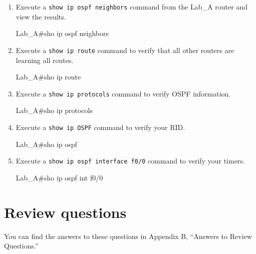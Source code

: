 \begin{enumerate}
\item
  Execute a \texttt{show\ ip\ ospf\ neighbors} command from the Lab\_A
  router and view the results.

\begin{cli}
Lab_A#sho ip ospf neighbors
\end{cli}
\item
  Execute a \texttt{show\ ip\ route} command to verify that all other
  routers are learning all routes.

\begin{cli}
Lab_A#sho ip route
\end{cli}
\item
  Execute a \texttt{show\ ip\ protocols} command to verify OSPF
  information.

\begin{cli}
Lab_A#sho ip protocols
\end{cli}
\item
  Execute a \texttt{show\ ip\ OSPF} command to verify your RID.

\begin{cli}
Lab_A#sho ip ospf
\end{cli}
\item
  Execute a \texttt{show\ ip\ ospf\ interface\ f0/0} command to verify
  your timers.

\begin{cli}
Lab_A#sho ip ospf int f0/0
\end{cli}
\end{enumerate}



\section{Review questions}

You can find the answers to these questions in Appendix B, ``Answers to
Review Questions.''

